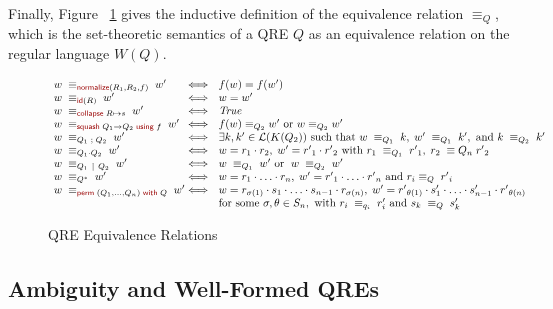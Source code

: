 \documentclass[acmsmall,review,anonymous]{acmart}
\newcommand{\kw}[1]{\textcolor{dkred}{\ensuremath{\mathsf{#1}}}}
\newcommand{\collapse}[2]{\ensuremath{\kw{collapse} \; #1 \mapsto #2}}
\newcommand{\squash}[3]{\ensuremath{\kw{squash} \; #1 \rightarrow #2\; \kw{using} \; #3}}
\newcommand{\perm}[2]{\ensuremath{\kw{perm}\; (#1)\; \kw{with}\; #2}}
\newcommand{\normalize}[3]{\ensuremath{\kw{normalize}(#1, #2, #3)}}
\newcommand{\eqrel}[1]{\ensuremath{\equiv_{#1}}}
\newcommand{\sep}{\ensuremath{\ | \ }}
\newcommand{\id}{\ensuremath{\kw{id}}}
\begin{document}
Finally, Figure ~\ref{fig:relations} gives the inductive definition of the
equivalence relation $\eqrel{Q}$, which is the set-theoretic semantics
of a QRE $Q$ as an equivalence relation on the regular language $W(Q)$.

\begin{figure}[t]
\centering
\[
\begin{array}{l@{}l@{\ \ }l}
w \; \equiv_{\normalize{R_1}{R_2}{f}} \; w' &\iff&
f(w)=f(w') \\
w \; \equiv_{\id(R)} \; w' &\iff& w = w' \\
w \; \equiv_{\collapse{R}{s}} \; w' &\iff& \mathit{True} \\ %
w \; \equiv_{\squash{Q_1}{Q_2}{f}} \; w' &\iff& f(w) \equiv_{Q_2} w'
\text{ or } w \equiv_{Q_2} w' \\
w \; \equiv_{Q_1 \; ; \; Q_2} \; w' &\iff& \exists k, k' \in
\mathcal{L}(K(Q_2)) \text{ such that } w \; \equiv_{Q_1} \; k, \; w' \;
\equiv_{Q_1} \; k', \text{ and } k \; \equiv_{Q_2} \; k'\\
w \; \equiv_{Q_1 \cdot Q_2} \; w'  &\iff& w = r_1
\cdot r_2, \; w' = {r'}_1 \cdot {r'}_2 \text{ with } r_1 \; \equiv_{Q_1}
\; {r'}_1, \; r_2 \; \equiv{Q_n} \; {r'}_2\\
w \; \equiv_{Q_1 \sep Q_2} \; w' &\iff& w \; \equiv_{Q_1} \; w'
\text{ or } \; w \; \equiv_{Q_2} \; w'\\
w \; \equiv_{Q^*} \; w' &\iff& w = r_1 \cdot \ldots \cdot r_n, \; w'
= {r'}_1 \cdot \ldots \cdot {r'}_n \text{ and } r_i \equiv_{Q} \; {r'}_i
\\
w \; \equiv_{\perm{Q_1, \ldots, Q_n}{Q}} \; w' &\iff& w = r_{\sigma(1)}
\cdot s_1 \cdot \ldots \cdot s_{n-1} \cdot r_{\sigma(n)}, \;
w' = {r'}_{\theta(1)} \cdot s'_1 \cdot \ldots \cdot s'_{n-1}
\cdot {r'}_{\theta(n)} \\
& & \text{for some } \sigma, \theta \in S_n, \text{ with } r_i \;
\equiv_{q_i} \; r'_i \text{ and } s_k \; \equiv_{Q} \; s'_{k}
\end{array}
\]
\caption{QRE Equivalence Relations}
\label{fig:relations}
\end{figure}
\subsection{Ambiguity and Well-Formed QREs}
\label{subsec:well-formed-qres}
\end{document}
